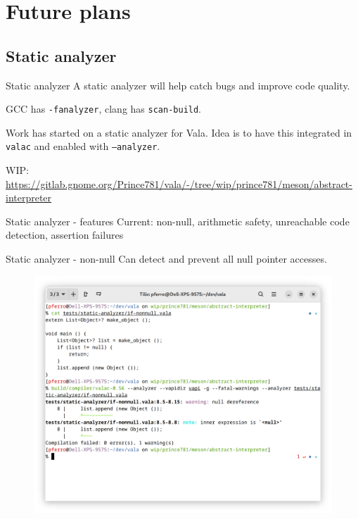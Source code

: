 \documentclass[t]{beamer}
\begin{document}
\section{Future plans}
\subsection{Static analyzer}
\begin{frame}[c]{Static analyzer}
A static analyzer will help catch bugs and improve code quality.

GCC has \texttt{-fanalyzer}, clang has \texttt{scan-build}.

Work has started on a static analyzer for Vala. Idea is to have this integrated in \texttt{valac} and enabled with \texttt{--analyzer}.

{\small WIP: \url{https://gitlab.gnome.org/Prince781/vala/-/tree/wip/prince781/meson/abstract-interpreter}}
\end{frame}

\begin{frame}[c]{Static analyzer - features}
Current: non-null, arithmetic safety, unreachable code detection, assertion failures
\end{frame}

\begin{frame}[c]{Static analyzer - non-null}
Can detect and prevent all null pointer accesses.

\begin{figure}
    \begin{center}
        \includegraphics[scale=.12]{res/static-analyzer-nonnull.png}
    \end{center}
\end{figure}
\end{frame}
\end{document}
